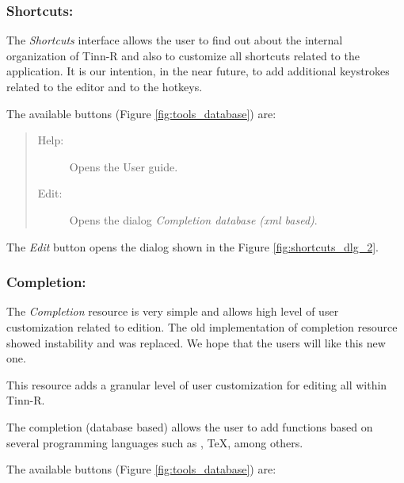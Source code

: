 \subsubsection{Shortcuts:}

The \textit{Shortcuts} interface allows the user to find out about
the internal organization of Tinn-R and also to customize all
shortcuts related to the application. It is our intention, in
the near future, to add additional keystrokes related to the
editor and to the \RR{} hotkeys.

The available buttons
(Figure \ref{fig:tools_database})
are:

\begin{quote}
  \begin{footnotesize}
    \begin{description}
      \item[Help:]
        Opens the User guide.
      \item[Edit:]
        Opens the dialog \textit{Completion database (xml based)}.
    \end{description}
  \end{footnotesize}
\end{quote}

The \textit{Edit} button opens the dialog shown in the Figure \ref{fig:shortcuts_dlg_2}.


\subsubsection{Completion:}
The \textit{Completion} resource is very simple and allows high level
of user customization related to edition. The old implementation of
completion resource showed instability and was replaced. We hope that
the users will like this new one.

This resource adds a granular level of user customization for editing
all within Tinn-R.

The completion (database based) allows the user to add functions based
on several programming languages such as \RR{}, \TeX, among others.

The available buttons
(Figure \ref{fig:tools_database})
are:

